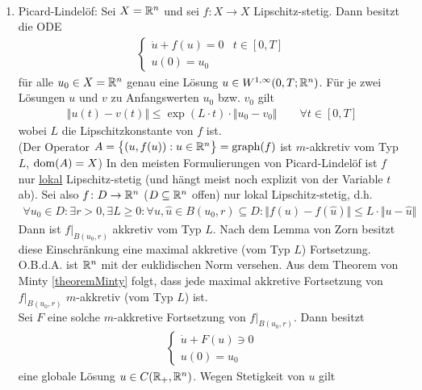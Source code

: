 \begin{korollar}\
	\begin{enumerate}[label=(\alph*)]
		\item Picard-Lindelöf: Sei $X=\mathbb{R}^n$ und sei $f:X\to X$ Lipschitz-stetig. 
		Dann besitzt die ODE
		\begin{align*}
			\left\lbrace\begin{array}{rr}
				\dot{u}+f(u)=0 & t\in[0,T]\\
				u(0)=u_0
			\end{array}\right.
		\end{align*}
		für alle $u_0\in X=\mathbb{R}^n$ genau eine Lösung $u\in W^{1,\infty}(0,T;\mathbb{R}^n)$. 
		Für je zwei Lösungen $u$ und $v$ zu Anfangswerten $u_0$ bzw. $v_0$ gilt
		\begin{align*}
			\big\Vert u(t)-v(t)\big\Vert\leq\exp(L\cdot t)\cdot\big\Vert u_0-v_0\big\Vert\qquad\forall t\in[0,T]
		\end{align*}
		wobei $L$ die Lipschitzkonstante von $f$ ist.\\
		(Der Operator $A=\big\lbrace(u,f(u)):u\in\mathbb{R}^n\big\rbrace=\operatorname{graph}(f)$ ist $m$-akkretiv vom Typ $L$, $\operatorname{dom}(A)=X$)\nl
		In den meisten Formulierungen von Picard-Lindelöf ist $f$ nur \ul{lokal} Lipschitz-stetig 
		(und hängt meist noch explizit von der Variable $t$ ab). Sei also $f\colon D\to\mathbb{R}^n$ ($D\subseteq \mathbb{R}^n$ offen) nur lokal Lipschitz-stetig, d.h. 
		\begin{align*}
			\forall u_0\in D:\exists r>0,\exists L\geq0:\forall u,\hat{u}\in B(u_0,r)\subseteq D:\big\Vert f(u)-f(\hat{u})\big\Vert\leq L\cdot\big\Vert u-\hat{u}\big\Vert
		\end{align*}
		Dann ist $f|_{B(u_0,r)}$ akkretiv vom Typ $L$. 
		Nach dem Lemma von Zorn besitzt diese Einschränkung eine maximal akkretive (vom Typ $L$) Fortsetzung.\\
		O.B.d.A. ist $\mathbb{R}^n$ mit der euklidischen Norm versehen. 
		Aus dem Theorem von Minty \ref{theoremMinty} folgt, dass jede maximal akkretive Fortsetzung von $f|_{B(u_0,r)}$ $m$-akkretiv (vom Typ $L$) ist.\\
		Sei $F$ eine solche $m$-akkretive Fortsetzung von $f|_{B(u_0,r)}$. 
		Dann besitzt 
		\begin{align*}
			\left\lbrace\begin{array}{r}
				\dot{u}+F(u)\ni 0\\
				u(0)=u_0
			\end{array}\right.
		\end{align*}
		eine globale Lösung $u\in C(\mathbb{R}_+,\mathbb{R}^n)$. Wegen Stetigkeit von $u$ gilt

\end{enumerate}
\end{korollar}
